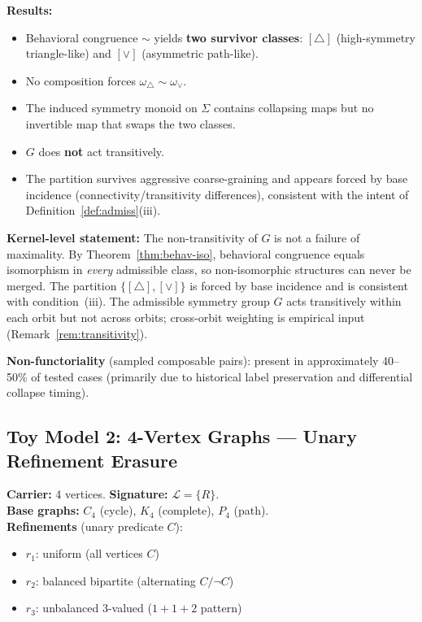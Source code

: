 \documentclass[11pt,a4paper]{article}
\theoremstyle{definition}
\theoremstyle{remark}
\begin{document}
\textbf{Results:}
\begin{itemize}[nosep]
  \item Behavioral congruence $\sim$ yields \textbf{two survivor classes}: $[\triangle]$ (high-symmetry triangle-like) and $[\vee]$ (asymmetric path-like).
  \item No composition forces $\omega_\triangle \sim \omega_\vee$.
  \item The induced symmetry monoid on $\Sigma$ contains collapsing maps but no invertible map that swaps the two classes.
  \item $G$ does \textbf{not} act transitively.
  \item The partition survives aggressive coarse-graining and appears forced by base incidence (connectivity/transitivity differences), consistent with the intent of Definition~\ref{def:admiss}(iii).
\end{itemize}

\textbf{Kernel-level statement:} The non-transitivity of $G$ is not a failure of maximality. By Theorem~\ref{thm:behav-iso}, behavioral congruence equals isomorphism in \emph{every} admissible class, so non-isomorphic structures can never be merged. The partition $\{[\triangle], [\vee]\}$ is forced by base incidence and is consistent with condition~(iii). The admissible symmetry group $G$ acts transitively within each orbit but not across orbits; cross-orbit weighting is empirical input (Remark~\ref{rem:transitivity}).

\textbf{Non-functoriality} (sampled composable pairs): present in approximately 40--50\% of tested cases (primarily due to historical label preservation and differential collapse timing).

\subsection{Toy Model 2: 4-Vertex Graphs --- Unary Refinement Erasure}

\textbf{Carrier:} 4 vertices. \textbf{Signature:} $\mathcal{L}=\{R\}$.\\
\textbf{Base graphs:} $C_4$ (cycle), $K_4$ (complete), $P_4$ (path).\\
\textbf{Refinements} (unary predicate $C$):
\begin{itemize}[nosep]
  \item $r_1$: uniform (all vertices $C$)
  \item $r_2$: balanced bipartite (alternating $C/\neg C$)
  \item $r_3$: unbalanced 3-valued ($1{+}1{+}2$ pattern)
\end{itemize}
\end{document}
